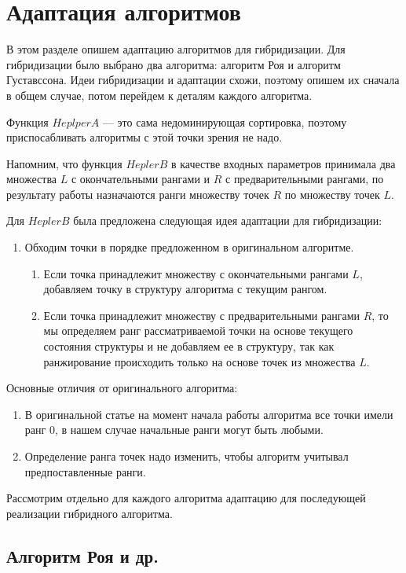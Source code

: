 \section{Адаптация алгоритмов}

В этом разделе опишем адаптацию алгоритмов для гибридизации. Для гибридизации было выбрано два алгоритма: алгоритм Роя и алгоритм Густавссона. Идеи гибридизации и адаптации схожи, поэтому опишем их сначала в общем случае, потом перейдем к деталям каждого алгоритма. 

Функция $HeplperA$ {---} это сама недоминирующая сортировка, поэтому приспосабливать алгоритмы с этой точки зрения не надо.

Напомним, что функция $HeplerB$ в качестве входных параметров принимала два множества $L$ с окончательными рангами и $R$ с предварительными рангами, по результату работы назначаются ранги множеству точек $R$ по множеству точек $L$. 

Для $HeplerB$ была предложена следующая идея адаптации для гибридизации: 
\begin{enumerate}
  \item Обходим точки в порядке предложенном в оригинальном алгоритме.
  \begin{enumerate}
      \item Если точка принадлежит множеству с окончательными рангами $L$, добавляем точку в структуру алгоритма с текущим рангом.
      \item Если точка принадлежит множеству с предварительными рангами $R$, то мы определяем ранг рассматриваемой точки на основе текущего состояния структуры и не добавляем ее в структуру, так как ранжирование происходить только на основе точек из множества $L$.
  \end{enumerate}
\end{enumerate}


Основные отличия от оригинального алгоритма: 
\begin{enumerate}
    \item В оригинальной статье на момент начала работы алгоритма все точки имели ранг 0, в нашем случае начальные ранги могут быть любыми.
    \item Определение ранга точек надо изменить, чтобы алгоритм учитывал предпоставленные ранги.
\end{enumerate}

Рассмотрим отдельно для каждого алгоритма адаптацию для последующей реализации гибридного алгоритма.

\subsection{Алгоритм Роя и др.}

